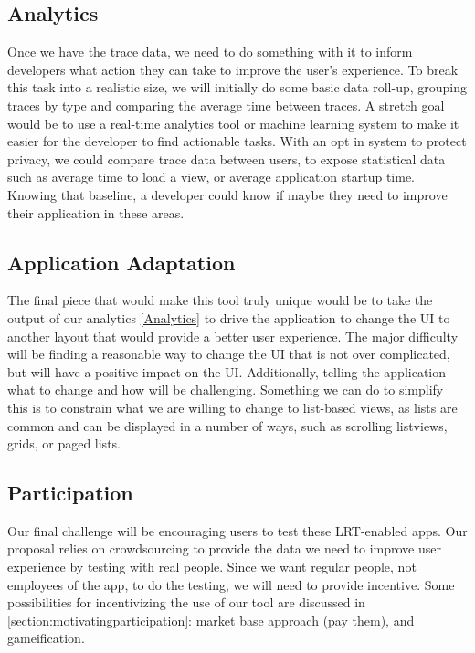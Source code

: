 \subsection{Analytics}
Once we have the trace data, we need to do something with it to inform developers
what action they can take to improve the user's experience. To break this task
into a realistic size, we will initially do some basic data roll-up, grouping
traces by type and comparing the average time between traces. A stretch goal
would be to use a real-time analytics tool or machine learning system 
to make it easier for the developer to find actionable tasks. With 
an opt in system to protect privacy, we could compare trace data between users,
to expose statistical data such as average time to load a view, or average 
application startup time. Knowing that baseline, a developer could know 
if maybe they need to improve their application in these areas.

\subsection{Application Adaptation}
The final piece that would make this tool truly unique would be to take the output
of our analytics \ref{Analytics} to drive the application to change the UI to
another layout that would provide a better user experience. The major difficulty will
be finding a reasonable way to change the UI that is not over complicated, but will
have a positive impact on the UI. Additionally, telling the application what to change
and how will be challenging. Something we can do to simplify this is to constrain what
we are willing to change to list-based views, as lists are common and can be displayed
in a number of ways, such as scrolling listviews, grids, or paged lists.

\subsection{Participation}
Our final challenge will be encouraging users to test these LRT-enabled apps. Our
proposal relies on crowdsourcing to provide the data we need to improve user
experience by testing with real people. Since we want regular people, not employees
of the app, to do the testing, we will need to provide incentive. Some possibilities
for incentivizing the use of our tool are discussed in \ref{section:motivatingparticipation}:
market base approach (pay them), and gameification.



